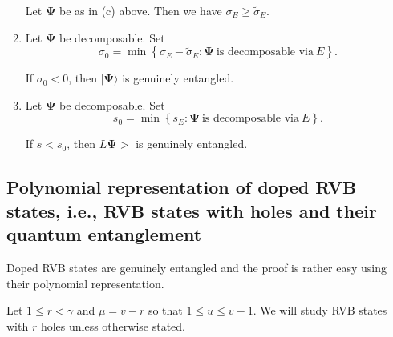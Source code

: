 \documentclass[a4paper,12pt]{article}
\theoremstyle{definition}
\theoremstyle{underlinethm}
\theoremstyle{definition}
\begin{document}
\begin{enumerate}[label=(\alph*)]
Let $\boldsymbol{\Psi}$ be as in (c) above. Then we have $\sigma_{E} \geq \widetilde{\sigma}_{E}$.

\item Let $\boldsymbol{\Psi}$ be decomposable. Set
$$
\sigma_{0} = \min \left\{\sigma_{E}- \widetilde{\sigma}_{E} : \boldsymbol{\Psi}~\text{is decomposable via}~ E\right\}.
$$

If $\sigma_{0} < 0$, then $| \boldsymbol{\Psi}\rangle$ is genuinely entangled.

\item Let $\boldsymbol{\Psi}$ be decomposable. Set
$$
s_{0} = \min \left\{s_{E} : \boldsymbol{\Psi}~ \text{is decomposable via}~E \right\}.
$$
 
 If $s < s_{0}$, then  $L \boldsymbol{\Psi} >$ is genuinely entangled. 
 
\end{enumerate}

\subsection{Polynomial representation of doped RVB states, i.e., RVB states with holes and their quantum entanglement}

Doped RVB states are genuinely entangled and the proof is rather easy using their polynomial representation.

Let $1 \leq r < \gamma$ and $\mu=v-r$ so that $1 \leq u \leq v-1$. We will study RVB states with $r$ holes unless otherwise stated.
\end{document}
